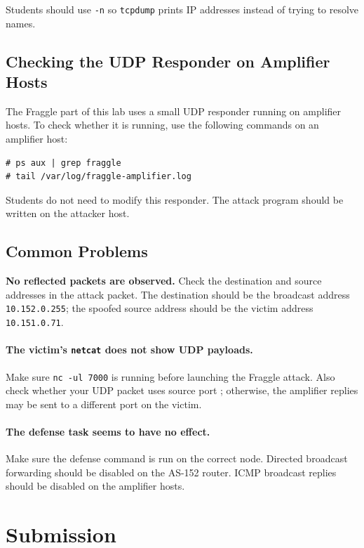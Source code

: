 Students should use \texttt{-n} so \texttt{tcpdump} prints IP addresses instead
of trying to resolve names.


\subsection{Checking the UDP Responder on Amplifier Hosts}

The Fraggle part of this lab uses a small UDP responder running on amplifier
hosts. To check whether it is running, use the following commands on an
amplifier host:

\begin{lstlisting}
# ps aux | grep fraggle
# tail /var/log/fraggle-amplifier.log
\end{lstlisting}

Students do not need to modify this responder. The attack program should be
written on the attacker host.


\subsection{Common Problems}

\noindent\textbf{No reflected packets are observed.}
Check the destination and source addresses in the attack packet. The destination
should be the broadcast address \texttt{10.152.0.255}; the spoofed source
address should be the victim address \texttt{10.151.0.71}.

\paragraph{The victim's \texttt{netcat} does not show UDP payloads.}
Make sure \texttt{nc -ul 7000} is running before launching the Fraggle attack.
Also check whether your UDP packet uses source port \fraggleport; otherwise, the
amplifier replies may be sent to a different port on the victim.

\paragraph{The defense task seems to have no effect.}
Make sure the defense command is run on the correct node. Directed broadcast
forwarding should be disabled on the AS-152 router. ICMP broadcast replies
should be disabled on the amplifier hosts.


\section{Submission}

